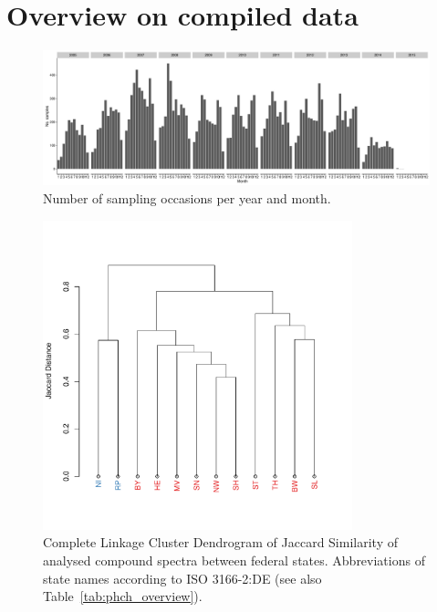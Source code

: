 \documentclass[pdftex,a4paper]{scrreprt}
\begin{document}
\chapter{Overview on compiled data}


\begin{figure}[ht]
	\centering
	\includegraphics[width = \textwidth]{temporal}
	\caption{Number of sampling occasions per year and month.}
	\label{fig:temporal}
\end{figure}

\begin{figure}[ht]
	\centering
	\includegraphics[width = 0.8\textwidth]{varclus}
	\caption[Complete Linkage Cluster Dendrogram of Jaccard Similarity of analysed compound spectra between federal states.]{Complete Linkage Cluster Dendrogram of Jaccard Similarity of analysed compound spectra between federal states. Abbreviations of state names according to ISO 3166-2:DE (see also Table~\ref{tab:phch_overview}).}
	\label{fig:varclus}
\end{figure}
\end{document}
